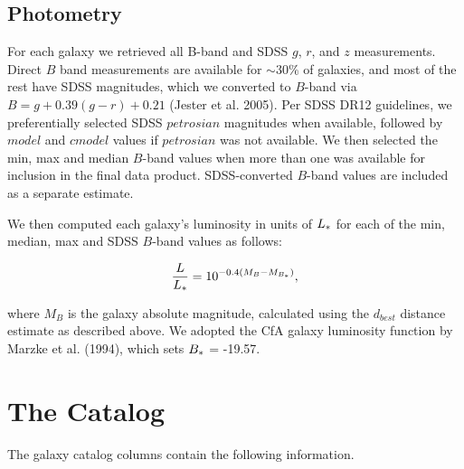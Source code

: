 \documentclass[iop]{emulateapj-rtx4}
\begin{document}
\subsection{Photometry}
For each galaxy we retrieved all B-band and SDSS $g$, $r$, and $z$ measurements. Direct $B$ band measurements are available for $\sim 30\%$ of galaxies, and most of the rest have SDSS magnitudes, which we converted to $B$-band via $B = g + 0.39 (g-r) + 0.21$ (Jester et al. 2005). Per SDSS DR12 guidelines, we preferentially selected SDSS $petrosian$ magnitudes when available, followed by $model$ and $cmodel$ values if $petrosian$ was not available. We then selected the min, max and median $B$-band values when more than one was available for inclusion in the final data product. SDSS-converted $B$-band values are included as a separate estimate. 

We then computed each galaxy's luminosity in units of $L_{\**}$ for each of the min, median, max and SDSS $B$-band values as follows:

\begin{equation}
	\frac{L}{L_{\**}} = 10^{-0.4 (M_{B} - M_{B_{\**}})},
	\label{lstar}
\end{equation}

where $M_B$ is the galaxy absolute magnitude, calculated using the $d_{best}$ distance estimate as described above. We adopted the CfA galaxy luminosity function by Marzke et al. (1994), which sets $B_{\**} $ = -19.57. 




\section{The Catalog}
The galaxy catalog columns contain the following information.
\end{document}
